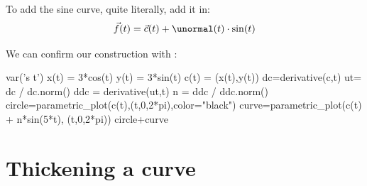 \documentclass{ximera}
\begin{document}
\begin{example}
\begin{explanation}
\begin{image}
\end{image}
To add the sine curve, quite literally, add it in:
\[
\vec{f}(t) = \vec{c}(t) + \unormal(t)\cdot \sin(t)
\]
\begin{onlineOnly}
We can confirm our construction with : 
\begin{sageCell}
var('s t')
x(t) = 3*cos(t)
y(t) = 3*sin(t)
c(t) = (x(t),y(t))
dc=derivative(c,t)
ut= dc / dc.norm()
ddc = derivative(ut,t)
n = ddc / ddc.norm()
circle=parametric_plot(c(t),(t,0,2*pi),color="black")
curve=parametric_plot(c(t) + n*sin(5*t), (t,0,2*pi))
circle+curve
\end{sageCell}
\end{onlineOnly}
  \end{explanation}
\end{example}

\section{Thickening a curve}
\end{document}

